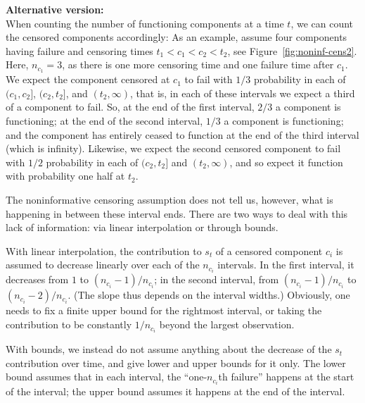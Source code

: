 \documentclass[12pt, a4paper]{elsarticle}
\begin{document}
\bigskip
\textbf{Alternative version:}\\

When counting the number of functioning components at a time $t$,
we can count the censored components accordingly:
As an example, assume four components having failure and censoring times $t_1 < c_1 < c_2 < t_2$,
see Figure~\ref{fig:noninf-cens2}.
Here, $n_{c_1} = 3$, as there is one more censoring time and one failure time after $c_1$.
We expect the component censored at $c_1$ to fail with $1/3$ probability in each of
$(c_1, c_2]$, $(c_2, t_2]$, and $(t_2, \infty)$,
that is, in each of these intervals we expect a third of a component to fail.
So, at the end of the first interval, $2/3$ a component is functioning;
at the end of the second interval, $1/3$ a component is functioning;
and the component has entirely ceased to function at the end of the third interval (which is infinity).
Likewise, we expect the second censored component to fail with $1/2$ probability
in each of $(c_2, t_2]$ and $(t_2, \infty)$,
and so expect it function with probability one half at $t_2$.

The noninformative censoring assumption does not tell us, however,
what is happening in between these interval ends.
There are two ways to deal with this lack of information:
via linear interpolation or through bounds.

With linear interpolation, the contribution to $s_t$ of a censored component $c_i$ 
is assumed to decrease linearly over each of the $n_{c_i}$ intervals.
In the first interval, it decreases from $1$ to $(n_{c_i} - 1)/n_{c_i}$;
in the second interval, from $(n_{c_i} - 1)/n_{c_i}$ to $(n_{c_i} - 2)/n_{c_i}$.
(The slope thus depends on the interval widths.)
Obviously, one needs to fix a finite upper bound for the rightmost interval,
or taking the contribution to be constantly $1/n_{c_i}$ beyond the largest observation.

With bounds, we instead do not assume anything about the decrease
of the $s_t$ contribution over time,
and give lower and upper bounds for it only.
The lower bound assumes that in each interval,
the ``one-$n_{c_i}$th failure'' happens at the start of the interval;
the upper bound assumes it happens at the end of the interval.
\end{document}
